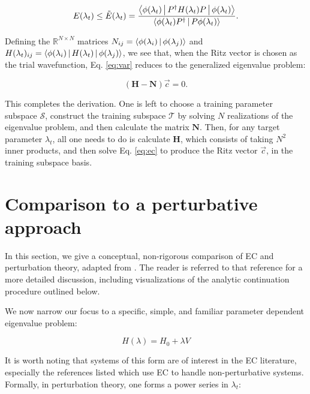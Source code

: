 \documentclass[%
 reprint,
 amsmath,amssymb,
 aps,
]{revtex4-2}
\begin{document}
\begin{equation}
  E(\lambda_t) \leq  \tilde{E}(\lambda_t) = \frac{\Braket{\phi(\lambda_t) | P^\dagger H(\lambda_t) P| \phi(\lambda_t) }}{\Braket{\phi(\lambda_t) P^\dagger | P \phi(\lambda_t) }}. \label{eq:var}
\end{equation}

Defining the $\mathbb{R}^{N\times N}$ matrices $N_{ij} =  \Braket{\phi(\lambda_i) | \phi(\lambda_j)}$ and $H(\lambda_t)_{ij} = \Braket{\phi(\lambda_i) | H(\lambda_t) | \phi(\lambda_j) }$, we see that, when the Ritz vector is chosen as the trial wavefunction, Eq. \ref{eq:var} reduces to the generalized eigenvalue problem:

\begin{equation}
  \left( \mathbf{H} - \mathbf{N} \right) \vec{c} = 0. \label{eq:ec}
\end{equation}

This completes the derivation. One is left to choose a training parameter subspace $\mathcal{S}$, construct the training subspace $\mathcal{T}$ by solving $N$ realizations of the eigenvalue problem, and then calculate the matrix $\mathbf{N}$. Then, for any target parameter $\lambda_t$, all one needs to do is calculate $\mathbf{H}$, which consists of taking $N^2$ inner products, and then solve Eq. \ref{eq:ec} to produce the Ritz vector $\vec{c}$, in the training subspace basis.

\section{\label{sec:comp}Comparison to a perturbative approach }

In this section, we give a conceptual, non-rigorous comparison of \ac{EC} and perturbation theory, adapted from \cite{frame2019ab}.
The reader is referred to that reference for a more detailed discussion, including visualizations of the analytic continuation procedure outlined below. 

We now narrow our focus to a specific, simple, and familiar parameter dependent eigenvalue problem:

\begin{equation}
  H(\lambda) = H_0 + \lambda V
\end{equation}

It is worth noting that systems of this form are of interest in the \ac{EC} literature, especially the references listed which use \ac{EC} to handle non-perturbative systems. Formally, in perturbation theory, one forms a power series in $\lambda_t$:
\end{document}
